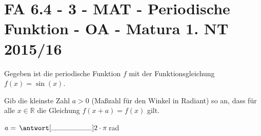 \section{FA 6.4 - 3 - MAT - Periodische Funktion - OA - Matura 1. NT 2015/16}

\begin{beispiel}[FA 6.4]{1} %
Gegeben ist die periodische Funktion $f$ mit der Funktionsgleichung $f(x) = \sin(x)$. \leer

Gib die kleinste Zahl $a>0$ (Maßzahl für den Winkel in Radiant) so an, dass für alle $x\in \mathbb{R}$ die Gleichung $f(x+a)=f(x)$ gilt. \leer

$a=\,\antwort[\rule{2cm}{0.3pt}]{2\cdot \pi}$\,rad


\end{beispiel}